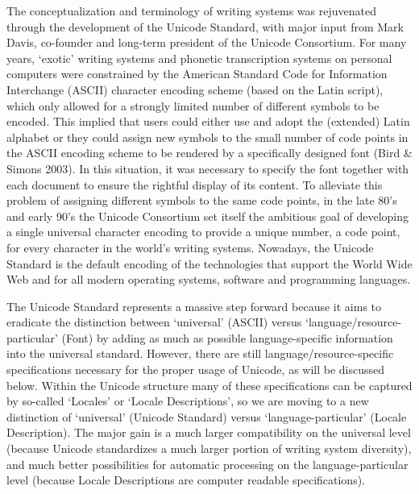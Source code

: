 The conceptualization and terminology of writing systems was rejuvenated through the development of the Unicode Standard, with major input from Mark Davis, co-founder and long-term president of the Unicode Consortium. For many years, `exotic' writing systems and phonetic transcription systems on personal computers were constrained by the American Standard Code for Information Interchange (ASCII) character encoding scheme (based on the Latin script), which only allowed for a strongly limited number of different symbols to be encoded. This implied that users could either use and adopt the (extended) Latin alphabet or they could assign new symbols to the small number of code points in the ASCII encoding scheme to be rendered by a specifically designed font (Bird \& Simons 2003). In this situation, it was necessary to specify the font together with each document to ensure the rightful display of its content. To alleviate this problem of assigning different symbols to the same code points, in the late 80's and early 90's the Unicode Consortium set itself the ambitious goal of developing a single universal character encoding to provide a unique number, a code point, for every character in the world's writing systems. Nowadays, the Unicode Standard is the default encoding of the technologies that support the World Wide Web and for all modern operating systems, software and programming languages.

The Unicode Standard represents a massive step forward because it aims to eradicate the distinction between `universal' (ASCII) versus `language/resource-particular' (Font) by adding as much as possible language-specific information into the universal standard. However, there are still language/resource-specific specifications necessary for the proper usage of Unicode, as will be discussed below. Within the Unicode structure many of these specifications can be captured by so-called `Locales' or `Locale Descriptions', so we are moving to a new distinction of `universal' (Unicode Standard) versus `language-particular' (Locale Description). The major gain is a much larger compatibility on the universal level (because Unicode standardizes a much larger portion of writing system diversity), and much better possibilities for automatic processing on the language-particular level (because Locale Descriptions are computer readable specifications).

